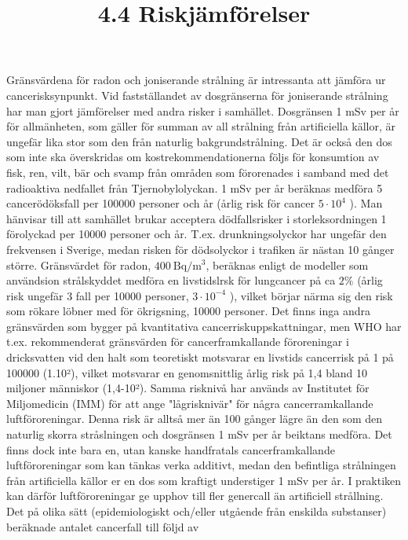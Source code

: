 \title{
4.4 Riskjämförelser
}
Gränsvärdena för radon och joniserande strålning är intressanta att jämföra ur cancerisksynpunkt. Vid fastställandet av dosgränserna för joniserande strålning har man gjort jämförelser med andra risker i samhället. Dosgränsen 1 mSv per år för allmänheten, som gäller för summan av all strålning från artificiella källor, är ungefär lika stor som den från naturlig bakgrundstrålning. Det är också den dos som inte ska överskridas om kostrekommendationerna följs för konsumtion av fisk, ren, vilt, bär och svamp från områden som förorenades i samband med det radioaktiva nedfallet från Tjernobylolyckan. 1 mSv per år beräknas medföra 5 cancerödöksfall per 100000 personer och år (årlig risk för cancer \(5 \cdot 10^{4}\) ). Man hänvisar till att samhället brukar acceptera dödfallsrisker i storleksordningen 1 förolyckad per 10000 personer och år. T.ex. drunkningsolyckor har ungefär den frekvensen i Sverige, medan risken för dödsolyckor i trafiken är nästan 10 gånger större.
Gränsvärdet för radon, \(400 \mathrm{~Bq} / \mathrm{m}^{3}\), beräknas enligt de modeller som användsion strålskyddet medföra en livstidslrsk för lungcancer på ca \(2 \%\) (årlig risk ungefär 3 fall per 10000 personer, \(3 \cdot 10^{-4}\) ), vilket börjar närma sig den risk som rökare löbner med för ökrigsning, 10000 personer.
Det finns inga andra gränsvärden som bygger på kvantitativa cancerriskuppskattningar, men WHO har t.ex. rekommenderat gränsvärden för cancerframkallande föroreningar i dricksvatten vid den halt som teoretiskt motsvarar en livstids cancerrisk på 1 på 100000 (1.10²), vilket motsvarar en genomsnittlig årlig risk på 1,4 bland 10 miljoner människor (1,4-10²). Samma risknivå har används av Institutet för Miljomedicin (IMM) för att ange "lågrisknivär" för några cancerramkallande luftföroreningar. Denna risk är alltså mer än 100 gånger lägre än den som den naturlig skorra stråslningen och dosgränsen 1 mSv per år beiktans medföra.
Det finns dock inte bara en, utan kanske handfratals cancerframkallande luftföroreningar som kan tänkas verka additivt, medan den befintliga strålningen från artificiella källor er en dos som kraftigt understiger 1 mSv per år. I praktiken kan därför luftföroreningar ge upphov till fler genercall än artificiell strållning. Det på olika sätt (epidemiologiskt och/eller utgående från enskilda substanser) beräknade antalet cancerfall till följd av


